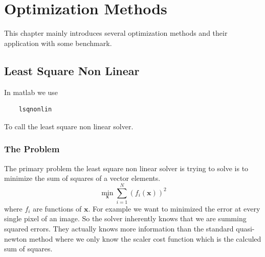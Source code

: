 \documentclass[../SQG_notes.tex]{subfiles}
\begin{document}
\section{Optimization Methods}

This chapter mainly introduces several optimization methods and their application with some benchmark.

\subsection{Least Square Non Linear}

In matlab we use 
\begin{lstlisting}
    lsqnonlin
\end{lstlisting}
To call the least square non linear solver. \par

\subsubsection{The Problem}
The primary problem the least square non linear solver is trying to solve is to minimize the sum of squares of a vector elements.
\begin{equation}
    \min_{\bm{x}} \sum_{i=1}^N (f_i(\bm{x}))^2
\end{equation}
where $f_i$ are functions of $\bm{x}$. For example we want to minimized the error at every single pixel of an image. So the solver inherently knows that we are summing squared errors. They actually knows more information than the standard quasi-newton method where we only know the scaler cost function which is the calculed sum of squares. 
\end{document}
